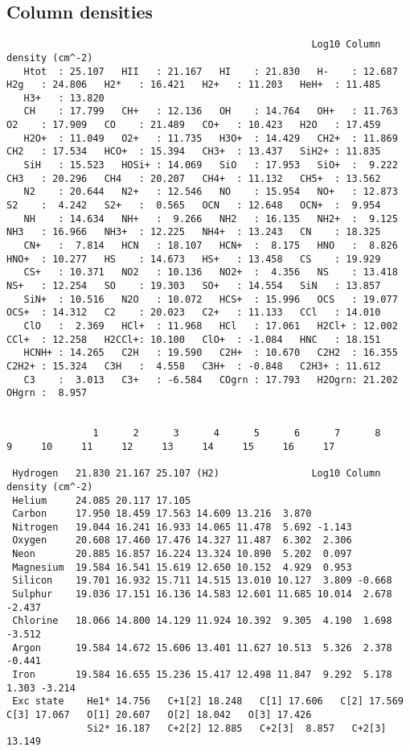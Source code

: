   \subsection{Column densities}
{\setverbatimfontsize{\tiny}
\begin{verbatim}
                                                     Log10 Column density (cm^-2)
   Htot  : 25.107   HII   : 21.167   HI    : 21.830   H-    : 12.687   H2g   : 24.806   H2*   : 16.421   H2+   : 11.203   HeH+  : 11.485
   H3+   : 13.820
   CH    : 17.799   CH+   : 12.136   OH    : 14.764   OH+   : 11.763   O2    : 17.909   CO    : 21.489   CO+   : 10.423   H2O   : 17.459
   H2O+  : 11.049   O2+   : 11.735   H3O+  : 14.429   CH2+  : 11.869   CH2   : 17.534   HCO+  : 15.394   CH3+  : 13.437   SiH2+ : 11.835
   SiH   : 15.523   HOSi+ : 14.069   SiO   : 17.953   SiO+  :  9.222   CH3   : 20.296   CH4   : 20.207   CH4+  : 11.132   CH5+  : 13.562
   N2    : 20.644   N2+   : 12.546   NO    : 15.954   NO+   : 12.873   S2    :  4.242   S2+   :  0.565   OCN   : 12.648   OCN+  :  9.954
   NH    : 14.634   NH+   :  9.266   NH2   : 16.135   NH2+  :  9.125   NH3   : 16.966   NH3+  : 12.225   NH4+  : 13.243   CN    : 18.325
   CN+   :  7.814   HCN   : 18.107   HCN+  :  8.175   HNO   :  8.826   HNO+  : 10.277   HS    : 14.673   HS+   : 13.458   CS    : 19.929
   CS+   : 10.371   NO2   : 10.136   NO2+  :  4.356   NS    : 13.418   NS+   : 12.254   SO    : 19.303   SO+   : 14.554   SiN   : 13.857
   SiN+  : 10.516   N2O   : 10.072   HCS+  : 15.996   OCS   : 19.077   OCS+  : 14.312   C2    : 20.023   C2+   : 11.133   CCl   : 14.010
   ClO   :  2.369   HCl+  : 11.968   HCl   : 17.061   H2Cl+ : 12.002   CCl+  : 12.258   H2CCl+: 10.100   ClO+  : -1.084   HNC   : 18.151
   HCNH+ : 14.265   C2H   : 19.590   C2H+  : 10.670   C2H2  : 16.355   C2H2+ : 15.324   C3H   :  4.558   C3H+  : -0.848   C2H3+ : 11.612
   C3    :  3.013   C3+   : -6.584   COgrn : 17.793   H2Ogrn: 21.202   OHgrn :  8.957


               1      2      3      4      5      6      7      8      9     10     11     12     13     14     15     16     17

 Hydrogen   21.830 21.167 25.107 (H2)                Log10 Column density (cm^-2)
 Helium     24.085 20.117 17.105
 Carbon     17.950 18.459 17.563 14.609 13.216  3.870
 Nitrogen   19.044 16.241 16.933 14.065 11.478  5.692 -1.143
 Oxygen     20.608 17.460 17.476 14.327 11.487  6.302  2.306
 Neon       20.885 16.857 16.224 13.324 10.890  5.202  0.097
 Magnesium  19.584 16.541 15.619 12.650 10.152  4.929  0.953
 Silicon    19.701 16.932 15.711 14.515 13.010 10.127  3.809 -0.668
 Sulphur    19.036 17.151 16.136 14.583 12.601 11.685 10.014  2.678 -2.437
 Chlorine   18.066 14.800 14.129 11.924 10.392  9.305  4.190  1.698 -3.512
 Argon      19.584 14.672 15.606 13.401 11.627 10.513  5.326  2.378 -0.441
 Iron       19.584 16.655 15.236 15.417 12.498 11.847  9.292  5.178  1.303 -3.214
 Exc state    He1* 14.756   C+1[2] 18.248   C[1] 17.606   C[2] 17.569   C[3] 17.067   O[1] 20.607   O[2] 18.042   O[3] 17.426
              Si2* 16.187   C+2[2] 12.885   C+2[3]  8.857   C+2[3] 13.149
\end{verbatim}
}


